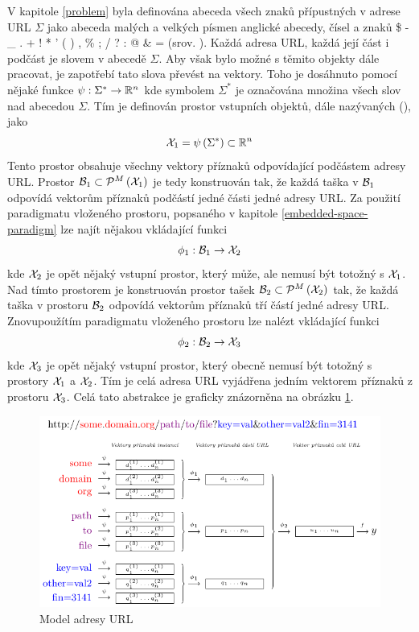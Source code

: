 V kapitole \ref{problem} byla definována abeceda všech znaků přípustných v adrese URL \( \Sigma \) jako abeceda malých a velkých písmen anglické abecedy, čísel a znaků \$ - \_ . + ! * ' ( ) , \% ; / ? : @ \& = (srov. \cite{berners-lee_uniform_1994}). Každá adresa URL, každá její část i podčást je slovem v abecedě \( \Sigma \). Aby však bylo možné s těmito objekty dále pracovat, je zapotřebí tato slova převést na vektory. Toho je dosáhnuto pomocí nějaké funkce \( \psi : \Sigma^* \to \mathbb R^n \) kde symbolem \( \Sigma^* \) je označována množina všech slov nad abecedou \( \Sigma \). Tím je definován prostor vstupních objektů, dále nazývaných  (), jako
\[ \mathcal X_1 = \psi \left( \Sigma^* \right) \subset \mathbb R^n \]
Tento prostor obsahuje všechny vektory příznaků odpovídající podčástem adresy URL. Prostor \( \mathcal B_1 \subset \mathcal P^M \left( \mathcal X_1 \right) \) je tedy konstruován tak, že každá taška v \( \mathcal B_1 \) odpovídá vektorům příznaků podčástí jedné části jedné adresy URL. Za použití paradigmatu vloženého prostoru, popsaného v kapitole \ref{embedded-space-paradigm} lze najít nějakou vkládající funkci
\[ \phi_1 : \mathcal B_1 \to \mathcal X_2 \]
kde \( \mathcal X_2 \) je opět nějaký vstupní prostor, který může, ale nemusí být totožný s \( \mathcal X_1 \). Nad tímto prostorem je konstruován prostor tašek \( \mathcal B_2 \subset \mathcal P^M \left( \mathcal X_2 \right) \) tak, že každá taška v prostoru \( \mathcal B_2 \) odpovídá vektorům příznaků tří částí jedné adresy URL. Znovupoužítím paradigmatu vloženého prostoru lze nalézt vkládající funkci
\[ \phi_2 : \mathcal B_2 \to \mathcal X_3 \]
kde \( \mathcal X_3 \) je opět nějaký vstupní prostor, který obecně nemusí být totožný s prostory \( \mathcal X_1 \) a \( \mathcal X_2 \). Tím je celá adresa URL vyjádřena jedním vektorem příznaků z prostoru \( \mathcal X_3 \). Celá tato abstrakce je graficky znázorněna na obrázku \ref{url_model_MIL}.

\begin{figure}[h]
	\centering
	\includegraphics{images/model_MIL/model_MIL.pdf}
	\caption{Model adresy URL}\label{url_model_MIL}
\end{figure}

